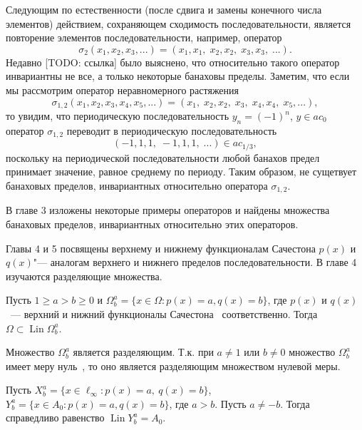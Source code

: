 Следующим по естественности (после сдвига и замены конечного числа элементов) действием, сохраняющем сходимость последовательности, является повторение элементов последовательности, например, оператор
\begin{equation}
	\sigma_2(x_1,x_2,x_3,...) = (x_1,x_1, \; x_2, x_2, \; x_3, x_3, \; ...)
	.
\end{equation}
Недавно [TODO: ссылка] было выяснено, что относительно такого оператор инвариантны не все, а только некоторые банаховы пределы.
Заметим, что если мы рассмотрим оператор неравномерного растяжения
\begin{equation}
	\sigma_{1,2}(x_1,x_2,x_3,x_4,x_5,...) = (x_1, \; x_2, x_2, \;  x_3, \; x_4, x_4, \; x_5, ...)
	,
\end{equation}
то увидим, что периодическую последовательность $y_n = (-1)^n$, $y\in ac_0$ оператор $\sigma_{1,2}$
переводит в периодическую последовательность
\begin{equation}
	(-1, 1, 1, \; -1, 1, 1, \; ...) \in ac_{1/3}
	,
\end{equation}
поскольку на периодической последовательности любой банахов предел принимает значение, равное среднему по периоду.
Таким образом, не сущетвует банаховых пределов, инвариантных относительно оператора $\sigma_{1,2}$.

В главе 3 изложены некоторые примеры операторов и найдены множества банаховых пределов,
инвариантных относительно этих операторов.


Главы 4 и 5 посвящены верхнему и нижнему функционалам Сачестона $p(x)$ и $q(x)$"--- аналогам верхнего и нижнего пределов последовательности.
В главе 4 изучаются разделяющие множества.


	Пусть
	$1 \geq a > b \geq 0$ и
	$\Omega^a_b = \{x\in\Omega : p(x) = a, q(x) = b\}$,
	где $p(x)$ и $q(x)$~--- верхний и нижний функционалы Сачестона~\cite{sucheston1967banach} соответственно.
	Тогда $\Omega \subset \operatorname{Lin} \Omega^a_b$.


	Множество $\Omega^a_b$ является разделяющим.
	Т.к. при $a\neq 1$ или $b\neq 0$ множество $\Omega^a_b$ имеет меру нуль~\cite{semenov2010characteristic,connor1990almost},
	то оно является разделяющим множеством нулевой меры.


Пусть $X^a_b = \{x\in\ell_\infty : p(x) = a,~ q(x) = b\}$, $Y^a_b = \{x\in A_0 : p(x) = a, q(x) = b\}$, где $a>b$.
	Пусть $a\neq -b$.
	Тогда справедливо равенство $\operatorname{Lin} Y^a_b = A_0$.

